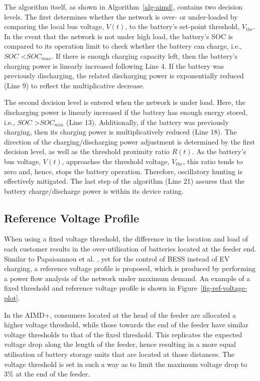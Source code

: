 The algorithm itself, as shown in Algorithm~\ref{alg-aimd}, contains two decision levels. The first determines whether the network is over- or under-loaded by comparing the local bus voltage, $V(t)$, to the battery's set-point threshold, $V_{thr}$. In the event that the network is not under high load, the battery's SOC is compared to its operation limit to check whether the battery can charge, i.e., $SOC$ \textless $SOC_{max}$. If there is enough charging capacity left, then the battery's charging power is linearly increased following Line 4. If the battery was previously discharging, the related discharging power is exponentially reduced (Line 9) to reflect the multiplicative decrease.

The second decision level is entered when the network is under load. Here, the discharging power is linearly increased if the battery has enough energy stored, i.e., $SOC$ \textgreater $SOC_{min}$ (Line 13). Additionally, if the battery was previously charging, then its charging power is multiplicatively reduced (Line 18). The direction of the charging/discharging power adjustment is determined by the first decision level, as well as the threshold proximity ratio $R(t)$. As the battery's bus voltage, $V(t)$, approaches the threshold voltage, $V_{thr}$, this ratio tends to zero and, hence, stops the battery operation. Therefore, oscillatory hunting is effectively mitigated. The last step of the algorithm (Line 21) assures that the battery charge/discharge power is within its device rating.

\subsection{Reference Voltage Profile}

When using a fixed voltage threshold, the difference in the location and load of each customer results in the over-utilisation of batteries located at the feeder end. Similar to Papaioannou et al. \cite{Papaioannou2015}, yet for the control of BESS instead of EV charging, a reference voltage profile is proposed, which is produced by performing a power flow analysis of the network under maximum demand. An example of a fixed threshold and reference voltage profile is shown in Figure~\ref{fig-ref-voltage-plot}.

In the AIMD+, consumers located at the head of the feeder are allocated a higher voltage threshold, while those towards the end of the feeder have similar voltage thresholds to that of the fixed threshold. This replicates the expected voltage drop along the length of the feeder, hence resulting in a more equal utilisation of battery storage units that are located at those distances. The voltage threshold is set in such a way as to limit the maximum voltage drop to 3\% at the end of the feeder.

